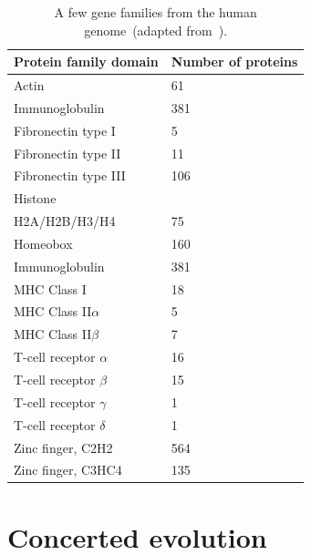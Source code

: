 \begin{table}
\begin{center}
\begin{tabular}{ll}
\hline\hline
Protein family domain & Number of proteins \\
\hline
Actin                 & 61 \\
Immunoglobulin        & 381 \\
Fibronectin type I    & 5 \\
Fibronectin type II   & 11 \\
Fibronectin type III  & 106 \\
Histone \\
\quad H2A/H2B/H3/H4   & 75 \\
Homeobox              & 160 \\
Immunoglobulin        & 381 \\
MHC Class I           & 18 \\
MHC Class II$\alpha$  & 5 \\
MHC Class II$\beta$   & 7 \\
T-cell receptor $\alpha$ & 16 \\
T-cell receptor $\beta$  & 15 \\
T-cell receptor $\gamma$ & 1 \\
T-cell receptor $\delta$ & 1 \\
Zinc finger, C2H2     & 564 \\
Zinc finger, C3HC4    & 135 \\
\hline
\end{tabular}
\end{center}
\caption{A few gene families from the human genome~(adapted from~\cite{Ohta2003,Venter-etal2001}).}\label{table:superfamilies}
\end{table}

\section*{Concerted evolution}

